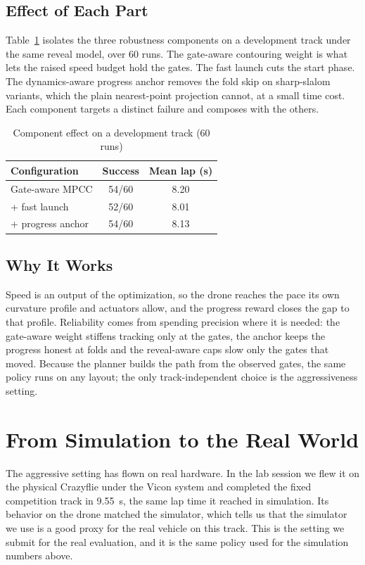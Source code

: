 \documentclass[conference]{IEEEtran}
\begin{document}
\subsection{Effect of Each Part}
Table~\ref{tab:ablation} isolates the three robustness components on a development track under the same reveal model, over 60 runs. The gate-aware contouring weight is what lets the raised speed budget hold the gates. The fast launch cuts the start phase. The dynamics-aware progress anchor removes the fold skip on sharp-slalom variants, which the plain nearest-point projection cannot, at a small time cost. Each component targets a distinct failure and composes with the others.

\begin{table}[htbp]
\caption{Component effect on a development track (60 runs)}
\begin{center}
\begin{tabular}{|l|c|c|}
\hline
\textbf{Configuration} & \textbf{Success} & \textbf{Mean lap (s)} \\
\hline
Gate-aware MPCC & 54/60 & 8.20 \\
\hline
+ fast launch & 52/60 & 8.01 \\
\hline
+ progress anchor & 54/60 & 8.13 \\
\hline
\end{tabular}
\label{tab:ablation}
\end{center}
\end{table}

\subsection{Why It Works}
Speed is an output of the optimization, so the drone reaches the pace its own curvature profile and actuators allow, and the progress reward closes the gap to that profile. Reliability comes from spending precision where it is needed: the gate-aware weight stiffens tracking only at the gates, the anchor keeps the progress honest at folds and the reveal-aware caps slow only the gates that moved. Because the planner builds the path from the observed gates, the same policy runs on any layout; the only track-independent choice is the aggressiveness setting.

\section{From Simulation to the Real World}
\label{sec:deploy}
The aggressive setting has flown on real hardware. In the lab session we flew it on the physical Crazyflie under the Vicon system and completed the fixed competition track in 9.55~s, the same lap time it reached in simulation. Its behavior on the drone matched the simulator, which tells us that the simulator we use is a good proxy for the real vehicle on this track. This is the setting we submit for the real evaluation, and it is the same policy used for the simulation numbers above.
\end{document}
